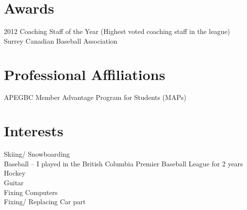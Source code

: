 \documentclass[]{friggeri-cv} %
\begin{document}

\section{Awards}

\begin{entrylist}
\entry
{2012}
{Coaching Staff of the Year (Highest voted coaching staff in the league)}
{}
{Surrey Canadian Baseball Association}
\end{entrylist}


\section{Professional Affiliations}
\begin{entrylist}
\entry
{}
{APEGBC Member Advantage Program for Students (MAPs)}
{}
{}
\end{entrylist}


\section{Interests}

Skiing/ Snowboarding \\
Baseball – I played in the British Columbia Premier Baseball League for 2 years \\
Hockey \\
Guitar \\
Fixing Computers \\
Fixing/ Replacing Car part \\
\end{document}

